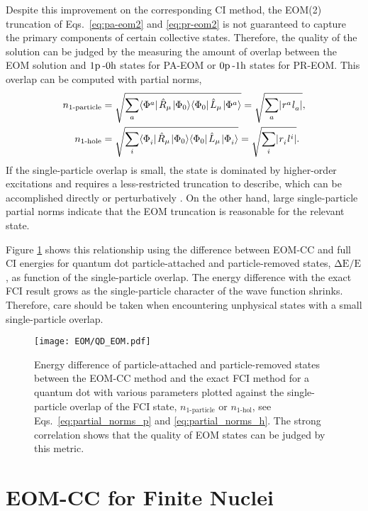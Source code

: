 \documentclass[thesis.tex]{subfiles}
\begin{document}
Despite this improvement on the corresponding CI method, the EOM(2) truncation of Eqs.\ \eqref{eq:pa-eom2} and \eqref{eq:pr-eom2} is not guaranteed to capture the primary components of certain collective states.  Therefore, the quality of the solution can be judged by the measuring the amount of overlap between the EOM solution and $1\mathrm{p}\hspace{2pt}\text{-}0\mathrm{h}$ states for PA-EOM or $0\mathrm{p}\hspace{2pt}\text{-}1\mathrm{h}$ states for PR-EOM.  This overlap can be computed with partial norms,
\begin{align}
  \label{eq:partial_norms_p}
  n_{\text{1-particle}} &= \sqrt{\sum_{a} \langle \Phi^{a}_{} |\hspace{1pt}\hat{R}\hspace{-0.1pt}_{\mu}\hspace{1pt}\lvert \Phi_{0} \rangle\langle \Phi_{0} |\hspace{1pt}\hat{L}\hspace{-0.1pt}_{\mu}\hspace{1pt}\lvert \Phi^{a}_{} \rangle } = \sqrt{\sum_{a} \lvert {}^{}r^{a}_{}{}^{}l^{\hspace{0.1pt}}_{a} \rvert },\\
  \label{eq:partial_norms_h}
  n_{\text{1-hole}} &= \sqrt{\sum_{i} \langle \Phi^{}_{i} |\hspace{1pt}\hat{R}\hspace{-0.1pt}_{\mu}\hspace{1pt}\lvert \Phi_{0} \rangle\langle \Phi_{0} |\hspace{1pt}\hat{L}\hspace{-0.1pt}_{\mu}\hspace{1pt}\lvert \Phi^{}_{i} \rangle } = \sqrt{\sum_{i} \lvert {}^{}r^{}_{i}{}^{}l^{\hspace{0.1pt}i}_{} \rvert }.
\end{align}
If the single-particle overlap is small, the state is dominated by higher-order excitations and requires a less-restricted truncation to describe, which can be accomplished directly or perturbatively \cite{PARZUCHOWSKI2017044304,MORRIS2017}.  On the other hand, large single-particle partial norms indicate that the EOM truncation is reasonable for the relevant state.

Figure \ref{fig:EOM-Quality} shows this relationship using the difference between EOM-CC and full CI energies for quantum dot particle-attached and particle-removed states, $\mathrm{\Delta E/E}$, as function of the single-particle overlap.  The energy difference with the exact FCI result grows as the single-particle character of the wave function shrinks.  Therefore, care should be taken when encountering unphysical states with a small single-particle overlap.
\begin{figure}[h]
  \centering
  \texttt{[image: EOM/QD\_EOM.pdf]}
  \caption{Energy difference of particle-attached and particle-removed states between the EOM-CC method and the exact FCI method for a quantum dot with various parameters plotted against the single-particle overlap of the FCI state, $n_{\text{1-particle}}$ or $n_{\text{1-hol}}$, see Eqs.\ \eqref{eq:partial_norms_p} and \eqref{eq:partial_norms_h}.  The strong correlation shows that the quality of EOM states can be judged by this metric.}
  \label{fig:EOM-Quality}
\end{figure}


\section{EOM-CC for Finite Nuclei} \label{section:eom_nuclei}
\end{document}
